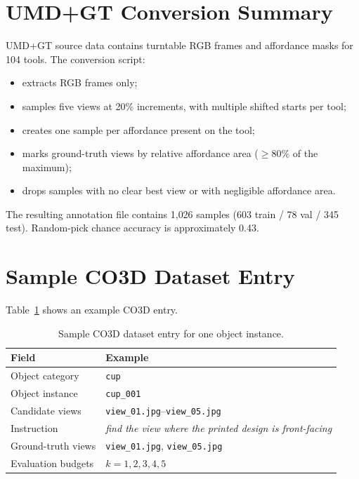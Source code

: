 \section{UMD+GT Conversion Summary}

UMD+GT source data contains turntable RGB frames and affordance masks for 104 tools. The conversion script:

\begin{itemize}
    \item extracts RGB frames only;
    \item samples five views at 20\% increments, with multiple shifted starts per tool;
    \item creates one sample per affordance present on the tool;
    \item marks ground-truth views by relative affordance area (\(\geq 80\%\) of the maximum);
    \item drops samples with no clear best view or with negligible affordance area.
\end{itemize}

The resulting annotation file contains 1{,}026 samples (603 train / 78 val / 345 test). Random-pick chance accuracy is approximately 0.43.

\section{Sample CO3D Dataset Entry}

Table~\ref{tab:sample-dataset-entry} shows an example CO3D entry.

\begin{table}[htbp]
    \centering
    \caption{Sample CO3D dataset entry for one object instance.}
    \label{tab:sample-dataset-entry}
    \begin{tabular}{ll}
        \hline
        Field & Example \\
        \hline
        Object category & \texttt{cup} \\
        Object instance & \texttt{cup\_001} \\
        Candidate views & \texttt{view\_01.jpg}--\texttt{view\_05.jpg} \\
        Instruction & \textit{find the view where the printed design is front-facing} \\
        Ground-truth views & \texttt{view\_01.jpg}, \texttt{view\_05.jpg} \\
        Evaluation budgets & \(k = 1,2,3,4,5\) \\
        \hline
    \end{tabular}
\end{table}

